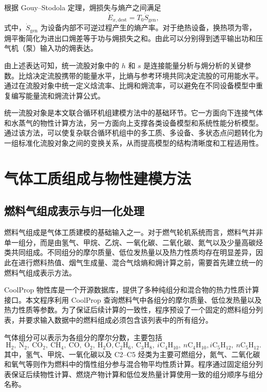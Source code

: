 根据 Gouy--Stodola 定理，㶲损失与熵产之间满足
\begin{equation}\label{eq:gouy-stodola}
\dot{E}_{x,\mathrm{dest}}
=
T_0\dot{S}_{\mathrm{gen}},
\end{equation}
式中，$\dot{S}_{\mathrm{gen}}$ 为设备内部不可逆过程产生的熵产率。对于绝热设备，换热项为零，㶲平衡简化为进出口㶲差等于功与㶲损失之和。由此可以分别得到透平输出功和压气机（泵）输入功的㶲表达。

由上述表达可知，统一流股对象中的 $h$ 和 $s$ 是连接能量分析与㶲分析的关键参数。比焓决定流股携带的能量水平，比熵与参考环境共同决定流股的可用能水平。通过在流股对象中统一定义焓流率、比㶲和㶲流率，可以避免在不同设备模型中重复编写能量流和㶲流计算公式。

统一流股对象是本文联合循环机组建模方法中的基础环节。它一方面向下连接气体和水蒸气的物性计算方法，另一方面向上支撑各类设备模型和系统性能分析模型。通过该方法，可以使复杂联合循环机组中的多工质、多设备、多状态点问题转化为一组标准化流股对象之间的变换关系，从而提高模型的结构清晰度和工程适用性。

\section{气体工质组成与物性建模方法}

\subsection{燃料气组成表示与归一化处理}

燃料气组成是气体工质建模的基础输入之一。对于燃气轮机系统而言，燃料气并非单一组分，而是由氢气、甲烷、乙烷、一氧化碳、二氧化碳、氮气以及少量高碳烃类共同组成。不同组分的摩尔质量、低位发热量以及热力性质均存在明显差异，因此在进行燃料热值、烟气生成量、混合气焓熵和㶲计算之前，需要首先建立统一的燃料气组成表示方法。

CoolProp 物性库是一个开源数据库，提供了多种纯组分和混合物的热力性质计算接口。本文程序利用 CoolProp 查询燃料气中各组分的摩尔质量、低位发热量以及热力性质等参数。为了保证后续计算的一致性，程序预设了一个固定的燃料组分列表，并要求输入数据中的燃料组成必须包含该列表中的所有组分。

气体组分可以表示为各组分的摩尔分数，主要包括
\begin{equation}\label{eq:fuel-components}
\mathrm{H_2},\ \mathrm{N_2},\ \mathrm{CO_2},\ \mathrm{CH_4},\ \mathrm{CO},\ \mathrm{O_2},\ \mathrm{H_2O},
\mathrm{C_2H_6},\ \mathrm{C_3H_8},\ i\mathrm{C_4H_{10}},\ n\mathrm{C_4H_{10}},
i\mathrm{C_5H_{12}},\ n\mathrm{C_5H_{12}} .
\end{equation}
其中，氢气、甲烷、一氧化碳以及 C2--C5 烃类为主要可燃组分，氮气、二氧化碳和氧气等则作为燃料中的惰性组分参与混合物平均性质计算。程序通过固定组分列表保证后续物性计算、燃烧产物计算和低位发热量计算使用一致的组分顺序与组分名称。

